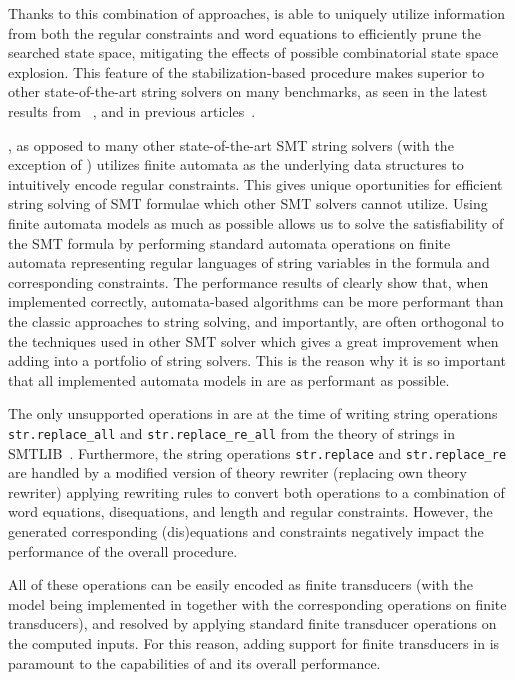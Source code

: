 Thanks to this combination of approaches, \noodler is able to uniquely utilize information from both the regular constraints and word equations to efficiently prune the searched state space, mitigating the effects of possible combinatorial state space explosion.
This feature of the stabilization-based procedure makes \noodler superior to other state-of-the-art string solvers on many benchmarks, as seen in the latest results from \noodler~\cite{tacas24_noodler_10.1007/978-3-031-57246-3_2}, and in previous articles~\cite{fm23_equations_synergy_regular_constraints_DBLP:conf/fm/BlahoudekCCHHLS23, oopsla23_stabilization_DBLP:journals/pacmpl/ChenCHHLS23}.

\noodler, as opposed to many other state-of-the-art SMT string solvers (with the exception of \ostrich) utilizes finite automata as the underlying data structures to intuitively encode regular constraints.
This gives \noodler unique oportunities for efficient string solving of SMT formulae which other SMT solvers cannot utilize.
Using finite automata models as much as possible allows us to solve the satisfiability of the SMT formula by performing standard automata operations on finite automata representing regular languages of string variables in the formula and corresponding constraints.
The performance results of \noodler clearly show that, when implemented correctly, automata-based algorithms can be more performant than the classic approaches to string solving, and importantly, are often orthogonal to the techniques used in other SMT solver which gives a great improvement when adding \noodler into a portfolio of string solvers.
This is the reason why it is so important that all implemented automata models in \mata are as performant as possible.

The only unsupported operations in \noodler are at the time of writing string operations \texttt{str.replace\_all} and \texttt{str.replace\_re\_all} from the theory of strings in SMTLIB~\cite{smtlib_theory_strings}.
Furthermore, the string operations \texttt{str.replace} and \texttt{str.replace\_re} are handled by a modified \noodler version of theory rewriter (replacing \ziii own theory rewriter) applying rewriting rules to convert both operations to a combination of word equations, disequations, and length and regular constraints.
However, the generated corresponding (dis)equations and constraints negatively impact the performance of the overall procedure.

All of these operations can be easily encoded as finite transducers (with the model being implemented in \mata together with the corresponding operations on finite transducers), and resolved by applying standard finite transducer operations on the computed inputs.
For this reason, adding support for finite transducers in \mata is paramount to the capabilities of \noodler and its overall performance.

